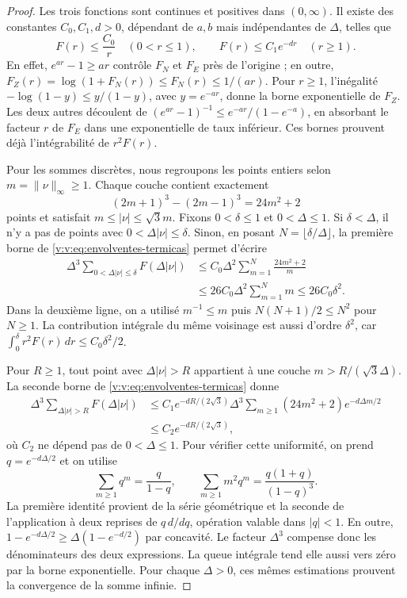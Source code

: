 \begin{proof}
Les trois fonctions sont continues et positives dans \((0,\infty)\).
Il existe des constantes \(C_0,C_1,d>0\), dépendant de \(a,b\) mais
indépendantes de \(\Delta\), telles que
\begin{equation}
 F(r)\leq\frac{C_0}{r}\quad(0<r\leq1),\qquad
 F(r)\leq C_1e^{-dr}\quad(r\geq1).
 \label{v:v:eq:envolventes-termicas}
\end{equation}
En effet, \(e^{ar}-1\geq ar\) contrôle \(F_N\) et \(F_E\)
près de l’origine ; en outre,
\(F_Z(r)=\log(1+F_N(r))\leq F_N(r)\leq1/(ar)\).
Pour \(r\geq1\), l’inégalité
\(-\log(1-y)\leq y/(1-y)\), avec \(y=e^{-ar}\), donne la borne
exponentielle de \(F_Z\). Les deux autres découlent de
\((e^{ar}-1)^{-1}\leq e^{-ar}/(1-e^{-a})\), en absorbant le facteur
\(r\) de \(F_E\) dans une exponentielle de taux inférieur. Ces bornes
prouvent déjà l’intégrabilité de \(r^2F(r)\).

Pour les sommes discrètes, nous regroupons les points entiers selon
\(m=\|\nu\|_\infty\geq1\). Chaque couche contient exactement
\[
 (2m+1)^3-(2m-1)^3=24m^2+2
\]
points et satisfait \(m\leq|\nu|\leq\sqrt3m\).
Fixons \(0<\delta\leq1\) et \(0<\Delta\leq1\).
Si \(\delta<\Delta\), il n’y a pas de points avec
\(0<\Delta|\nu|\leq\delta\). Sinon, en posant
\(N=\lfloor\delta/\Delta\rfloor\), la première borne de
\eqref{v:v:eq:envolventes-termicas} permet d’écrire
\begin{align*}
 \Delta^3\!\sum_{0<\Delta|\nu|\leq\delta}F(\Delta|\nu|)
 &\leq C_0\Delta^2\sum_{m=1}^{N}\frac{24m^2+2}{m}\\
 &\leq26C_0\Delta^2\sum_{m=1}^{N}m
 \leq26C_0\delta^2.
\end{align*}
Dans la deuxième ligne, on a utilisé \(m^{-1}\leq m\) puis
\(N(N+1)/2\leq N^2\) pour \(N\geq1\).
La contribution intégrale du même voisinage est aussi d’ordre
\(\delta^2\), car
\(\int_0^\delta r^2F(r)\,dr\leq C_0\delta^2/2\).

Pour \(R\geq1\), tout point avec \(\Delta|\nu|>R\) appartient
à une couche \(m>R/(\sqrt3\Delta)\). La seconde borne de
\eqref{v:v:eq:envolventes-termicas} donne
\begin{align*}
 \Delta^3\!\sum_{\Delta|\nu|>R}F(\Delta|\nu|)
 &\leq C_1e^{-dR/(2\sqrt3)}
 \Delta^3\sum_{m\geq1}(24m^2+2)e^{-d\Delta m/2}\\
 &\leq C_2e^{-dR/(2\sqrt3)},
\end{align*}
où \(C_2\) ne dépend pas de \(0<\Delta\leq1\). Pour vérifier
cette uniformité, on prend \(q=e^{-d\Delta/2}\) et on utilise
\[
 \sum_{m\geq1}q^m=\frac{q}{1-q},\qquad
 \sum_{m\geq1}m^2q^m=\frac{q(1+q)}{(1-q)^3}.
\]
La première identité provient de la série géométrique et la seconde de
l’application à deux reprises de \(q\,d/dq\), opération valable dans \(|q|<1\).
En outre,
\(1-e^{-d\Delta/2}\geq\Delta(1-e^{-d/2})\) par concavité.
Le facteur \(\Delta^3\) compense donc les dénominateurs des
deux expressions. La queue intégrale tend elle aussi vers zéro par la
borne exponentielle. Pour chaque \(\Delta>0\), ces mêmes estimations
prouvent la convergence de la somme infinie.


\end{proof}
